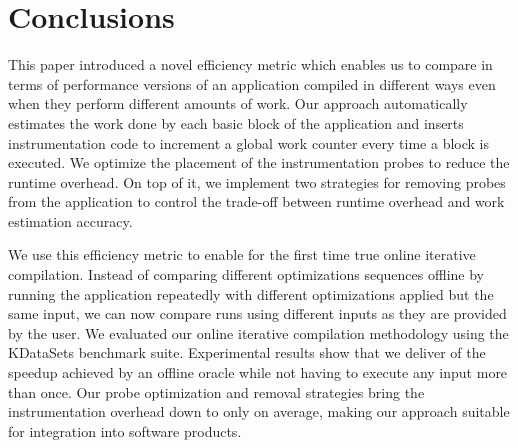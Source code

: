 \section{Conclusions}
This paper introduced a novel efficiency metric which enables us to compare in terms of performance versions of an application compiled in
different ways even when they perform different amounts of work. Our approach automatically estimates the work done by each basic block of
the application and inserts instrumentation code to increment a global work counter every time a block is executed. We optimize the
placement of the instrumentation probes to reduce the runtime overhead. On top of it, we implement two strategies for removing probes from
the application to control the trade-off between runtime overhead and work estimation accuracy.

We use this efficiency metric to enable for the first time true online iterative compilation. Instead of comparing different optimizations
sequences offline by running the application repeatedly with different optimizations applied but the same input, we can now compare runs
using different inputs as they are provided by the user. We evaluated our online iterative compilation methodology using the KDataSets
benchmark suite. Experimental results show that we deliver  of the speedup achieved by an offline oracle while not having to 
execute any input more than once. Our probe optimization and removal strategies bring the instrumentation overhead down to only 
on average, making our approach suitable for integration into software products. 






